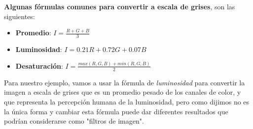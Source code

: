 \begin{tcolorbox}[colback=mint,colframe=yellow!75!black,arc=0pt,outer arc=0pt]
  \textbf{Algunas fórmulas comunes para convertir a escala de grises}, son las siguientes: \\

  \begin{itemize}
    \item \textbf{Promedio}: $I = \frac{R + G + B}{3}$
    \item \textbf{Luminosidad}: $I = 0.21R + 0.72G + 0.07B$
    \item \textbf{Desaturación}: $I = \frac{max(R, G, B) + min(R, G, B)}{2}$
  \end{itemize}
\end{tcolorbox}

Para nuestro ejemplo, vamos a usar la fórmula de \textit{luminosidad} para convertir la imagen a escala de grises que es
un promedio pesado de los canales de color, y que representa la percepción humana de la luminosidad, pero como dijimos
no es la única forma y cambiar esta fórmula puede dar diferentes resultados que podrían considerarse como "filtros de
imagen".




